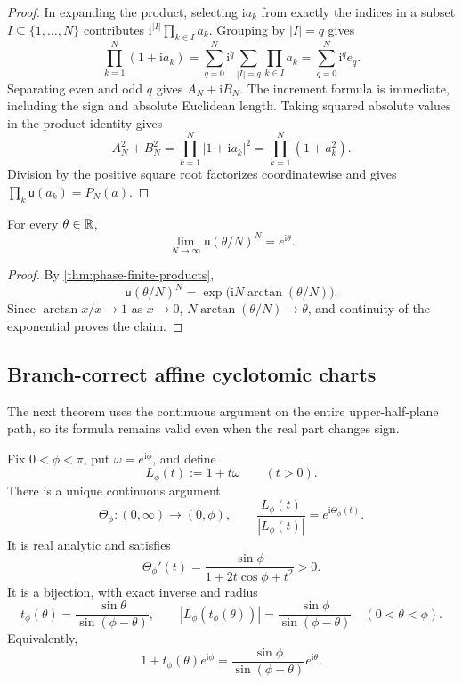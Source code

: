 \begin{proof}
In expanding the product, selecting \(\mathrm ia_k\) from exactly the indices
in a subset \(I\subseteq\{1,\ldots,N\}\) contributes
\(\mathrm i^{|I|}\prod_{k\in I}a_k\).  Grouping by \(|I|=q\) gives
\[
 \prod_{k=1}^N(1+\mathrm ia_k)
 =
 \sum_{q=0}^N\mathrm i^q
 \sum_{|I|=q}\prod_{k\in I}a_k
 =
 \sum_{q=0}^N\mathrm i^qe_q.
\]
Separating even and odd \(q\) gives \(A_N+\mathrm iB_N\).  The increment
formula is immediate, including the sign and absolute Euclidean length.
Taking squared absolute values in the product identity gives
\[
 A_N^2+B_N^2
 =
 \prod_{k=1}^N|1+\mathrm ia_k|^2
 =
 \prod_{k=1}^N(1+a_k^2).
\]
Division by the positive square root factorizes coordinatewise and gives
\(\prod_k\mathsf u(a_k)=P_N(a)\).
\end{proof}

\begin{corollary}
\label{cor:phase-equal-step-limit}
For every \(\theta\in\mathbb R\),
\[
 \lim_{N\to\infty}\mathsf u(\theta/N)^N=e^{\mathrm i\theta}.
\]
\end{corollary}

\begin{proof}
By \cref{thm:phase-finite-products},
\[
 \mathsf u(\theta/N)^N
 =
 \exp\bigl(\mathrm iN\arctan(\theta/N)\bigr).
\]
Since \(\arctan x/x\to1\) as \(x\to0\),
\(N\arctan(\theta/N)\to\theta\), and continuity of the exponential proves the
claim.
\end{proof}

\subsection{Branch-correct affine cyclotomic charts}

The next theorem uses the continuous argument on the entire upper-half-plane
path, so its formula remains valid even when the real part changes sign.

\begin{theorem}
\label{thm:phase-affine-chart}
Fix \(0<\phi<\pi\), put \(\omega=e^{\mathrm i\phi}\), and define
\[
 L_\phi(t):=1+t\omega
 \qquad(t>0).
\]
There is a unique continuous argument
\[
 \Theta_\phi:(0,\infty)\longrightarrow(0,\phi),
 \qquad
 \frac{L_\phi(t)}{|L_\phi(t)|}=e^{\mathrm i\Theta_\phi(t)}.
\]
It is real analytic and satisfies
\[
 \Theta_\phi'(t)
 =
 \frac{\sin\phi}{1+2t\cos\phi+t^2}>0.
\]
It is a bijection, with exact inverse and radius
\[
 t_\phi(\theta)
 =
 \frac{\sin\theta}{\sin(\phi-\theta)},
 \qquad
 |L_\phi(t_\phi(\theta))|
 =
 \frac{\sin\phi}{\sin(\phi-\theta)}
 \quad(0<\theta<\phi).
\]
Equivalently,
\[
 1+t_\phi(\theta)e^{\mathrm i\phi}
 =
 \frac{\sin\phi}{\sin(\phi-\theta)}e^{\mathrm i\theta}.
\]
\end{theorem}

